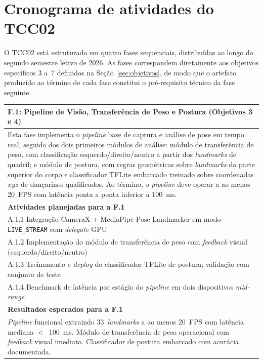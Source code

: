 \newpage
\section{Cronograma de atividades do TCC02}
\label{sc:cronograma}

O TCC02 está estruturado em quatro fases sequenciais, distribuídas ao longo do segundo
semestre letivo de 2026. As fases correspondem diretamente aos objetivos específicos 3 a~7
definidos na Seção~\ref{sec:objetivos}, de modo que o artefato produzido ao término de cada
fase constitui o pré-requisito técnico da fase seguinte.

\begin{longtable}{p{\textwidth}}
\toprule%
\myrowcolour%
\bfseries F.1: Pipeline de Visão, Transferência de Peso e Postura (Objetivos 3 e 4) \\
\midrule
Esta fase implementa o \textit{pipeline} base de captura e análise de pose em tempo real,
seguido dos dois primeiros módulos de análise: módulo de transferência de peso, com
classificação esquerdo/direito/neutro a partir dos \textit{landmarks} de quadril; e módulo
de postura, com regras geométricas sobre \textit{landmarks} da parte superior do corpo e
classificador TFLite embarcado treinado sobre coordenadas $xyz$ de dançarinos qualificados. Ao término,
o \textit{pipeline} deve operar a ao menos 20~FPS com latência ponta a ponta inferior a
100~ms.
\\
\midrule
\myrowcolour%
\bfseries Atividades planejadas para a F.1 \\
\midrule
A.1.1 Integração CameraX + MediaPipe Pose Landmarker em modo \texttt{LIVE\_STREAM} com \textit{delegate} GPU \\
A.1.2 Implementação do módulo de transferência de peso com \textit{feedback} visual (esquerdo/direito/neutro) \\
A.1.3 Treinamento e \textit{deploy} do classificador TFLite de postura; validação com conjunto de teste \\
A.1.4 Benchmark de latência por estágio do \textit{pipeline} em dois dispositivos \textit{mid-range} \\
\midrule
\myrowcolour%
\bfseries Resultados esperados para a F.1 \\
\midrule
\textit{Pipeline} funcional extraindo 33~\textit{landmarks} a ao menos 20~FPS com latência
mediana $<$~100~ms. Módulo de transferência de peso operacional com \textit{feedback} visual
imediato. Classificador de postura embarcado com acurácia documentada. \\

\end{longtable}
